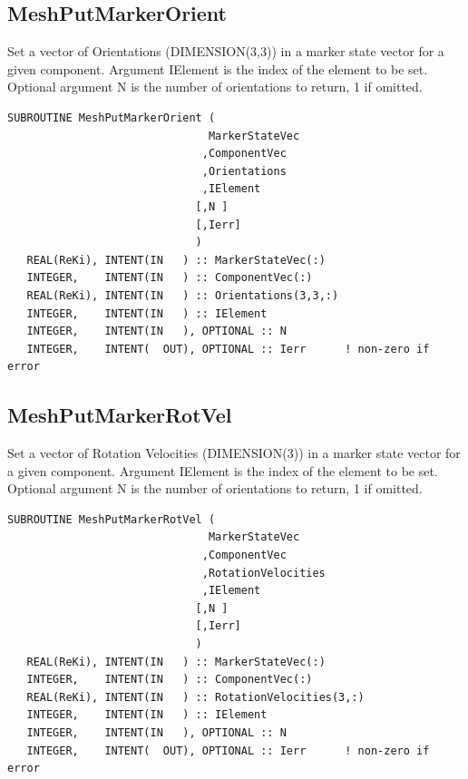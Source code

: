 \documentclass[11pt]{article}
\begin{document}
\subsection{MeshPutMarkerOrient}
Set a vector of Orientations (DIMENSION(3,3)) in a marker state vector for a given component.
Argument IElement is the index of the element to be set.
Optional argument N is the number of orientations to return, 1 if omitted.
\begin{verbatim}
SUBROUTINE MeshPutMarkerOrient ( 
                               MarkerStateVec
                              ,ComponentVec 
                              ,Orientations
                              ,IElement
                             [,N ]
                             [,Ierr]
                             )
   REAL(ReKi), INTENT(IN   ) :: MarkerStateVec(:)
   INTEGER,    INTENT(IN   ) :: ComponentVec(:)
   REAL(ReKi), INTENT(IN   ) :: Orientations(3,3,:)
   INTEGER,    INTENT(IN   ) :: IElement
   INTEGER,    INTENT(IN   ), OPTIONAL :: N
   INTEGER,    INTENT(  OUT), OPTIONAL :: Ierr 		! non-zero if error
\end{verbatim}

\subsection{MeshPutMarkerRotVel}
Set a vector of Rotation Velocities (DIMENSION(3)) in a marker state vector for a given component.
Argument IElement is the index of the element to be set.
Optional argument N is the number of orientations to return, 1 if omitted.
\begin{verbatim}
SUBROUTINE MeshPutMarkerRotVel ( 
                               MarkerStateVec
                              ,ComponentVec 
                              ,RotationVelocities
                              ,IElement
                             [,N ]
                             [,Ierr]
                             )
   REAL(ReKi), INTENT(IN   ) :: MarkerStateVec(:)
   INTEGER,    INTENT(IN   ) :: ComponentVec(:)
   REAL(ReKi), INTENT(IN   ) :: RotationVelocities(3,:)
   INTEGER,    INTENT(IN   ) :: IElement
   INTEGER,    INTENT(IN   ), OPTIONAL :: N
   INTEGER,    INTENT(  OUT), OPTIONAL :: Ierr 		! non-zero if error
\end{verbatim}
\end{document}
